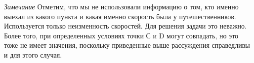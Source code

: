 	\textit{Замечание} Отметим, что мы не использовали информацию о том, кто именно выехал из какого пункта и какая именно скорость была у путешественников. Используется только неизменность скоростей. Для решения задачи это неважно. Более того, при определенных условиях точки С и D могут совпадать, но это тоже не имеет значения, поскольку приведенные выше рассуждения справедливы и для этого случая.